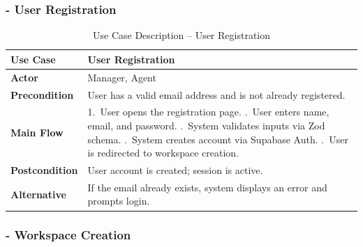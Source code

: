 \documentclass[12pt,a4paper]{report}
\newcommand{\reporttablesetup}{%
  \small%
  \setlength{\tabcolsep}{5pt}%
  \renewcommand{\arraystretch}{1.38}%
  \arrayrulecolor{framegray}%
}
\begin{document}
\subsubsection{- User Registration}

\begin{table}[H]
  \centering
  \renewcommand{\arraystretch}{1.3}
  \reporttablesetup
  \begin{tabularx}{\textwidth}{|>{\bfseries}p{3.1cm}|Y|}
    \hline
    Use Case      & User Registration \\
    \hline
    Actor         & Manager, Agent \\
    \hline
    Precondition  & User has a valid email address and is not already registered. \\
    \hline
    Main Flow     & 1.\ User opens the registration page. .\ User enters name, email, and password. .\ System validates inputs via Zod schema. .\ System creates account via Supabase Auth. .\ User is redirected to workspace creation. \\
    \hline
    Postcondition & User account is created; session is active. \\
    \hline
    Alternative   & If the email already exists, system displays an error and prompts login. \\
    \hline
  \end{tabularx}
  \caption{Use Case Description -- User Registration}
  \label{tab:uc01}
\end{table}

\subsubsection{- Workspace Creation}
\end{document}
